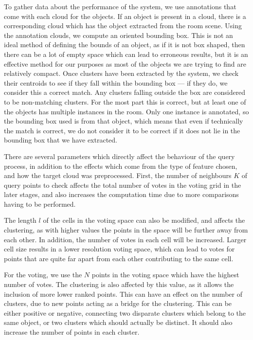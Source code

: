\documentclass[11pt,a4paper]{kth-mag}
\begin{document}
To gather data about the performance of the system, we use annotations that come
with each cloud for the objects. If an object is present in a cloud, there is a
corresponding cloud which has the object extracted from the room scene. Using
the annotation clouds, we compute an oriented bounding box. This is not an ideal
method of defining the bounds of an object, as if it is not box shaped, then
there can be a lot of empty space which can lead to erroneous results, but it is
an effective method for our purposes as most of the objects we are trying to
find are relatively compact. Once clusters have been extracted by the system, we
check their centroids to see if they fall within the bounding box --- if they
do, we consider this a correct match. Any clusters falling outside the box are
considered to be non-matching clusters. For the most part this is correct, but
at least one of the objects has multiple instances in the room. Only one
instance is annotated, so the bounding box used is from that object, which means
that even if technically the match is correct, we do not consider it to be
correct if it does not lie in the bounding box that we have extracted.

There are several parameters which directly affect the behaviour of the query
process, in addition to the effects which come from the type of feature chosen,
and how the target cloud was preprocessed. First, the number of neighbours $K$
of query points to check affects the total number of votes in the voting grid in
the later stages, and also increases the computation time due to more
comparisons having to be performed.

The length $l$ of the cells in the voting space can also be modified, and
affects the clustering, as with higher values the points in the space will be
further away from each other. In addition, the number of votes in each cell will
be increased. Larger cell size results in a lower resolution voting space, which
can lead to votes for points that are quite far apart from each other
contributing to the same cell.

For the voting, we use the $N$ points in the voting space which have the highest
number of votes. The clustering is also affected by this value, as it allows the
inclusion of more lower ranked points. This can have an effect on the number of
clusters, due to new points acting as a bridge for the clustering. This can be
either positive or negative, connecting two disparate clusters which belong to
the same object, or two clusters which should actually be distinct. It should
also increase the number of points in each cluster.
\end{document}
